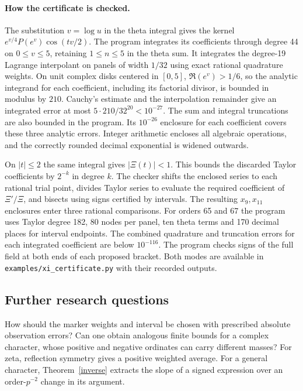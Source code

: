 \documentclass[11pt,letterpaper]{article}
\numberwithin{equation}{section}
\begin{document}
\paragraph{How the certificate is checked.}
The substitution $v=\log u$ in the theta integral gives the kernel
$e^{v/4}P(e^v)\cos(tv/2)$. The program integrates its coefficients through
degree 44 on $0\le v\le5$, retaining $1\le n\le5$ in the theta sum.
It integrates the degree-19 Lagrange interpolant on panels of width $1/32$
using exact rational quadrature weights. On unit complex disks centered in
$[0,5]$, $\Re(e^v)>1/6$, so the analytic integrand for each coefficient,
including its factorial divisor, is bounded in modulus by $210$. Cauchy's
estimate and the interpolation remainder give an integrated error at most
$5\cdot210/32^{20}<10^{-27}$. The sum and integral truncations are also
bounded in the program. Its $10^{-26}$ enclosure for each coefficient
covers these three analytic errors. Integer arithmetic encloses all
algebraic operations, and the correctly rounded decimal exponential is
widened outwards.

On $|t|\le2$ the same integral gives $|\Xi(t)|<1$. This bounds the
discarded Taylor coefficients by $2^{-k}$ in degree $k$. The checker
shifts the enclosed series to each rational trial point, divides Taylor
series to evaluate the required coefficient of $\Xi'/\Xi$, and bisects
using signs certified by intervals. The resulting $x_9,x_{11}$
enclosures enter three rational comparisons. For orders 65 and 67 the program uses Taylor degree 182, 80 nodes per
panel, ten theta terms and 170 decimal places for interval endpoints.
The combined quadrature and truncation errors for each integrated
coefficient are below $10^{-116}$. The program checks signs of the full
field at both ends of each proposed bracket. Both modes are available in
\texttt{examples/xi\_certificate.py} with their recorded outputs.

\subsection*{Further research questions}
How should the marker weights and interval be chosen with prescribed
absolute observation errors? Can one obtain analogous finite bounds for
a complex character, whose positive and negative ordinates can carry
different masses? For zeta, reflection symmetry gives a positive
weighted average. For a general character, Theorem~\ref{inverse}
extracts the slope of a signed expression over an order-$p^{-2}$ change
in its argument.
\newpage
\end{document}
